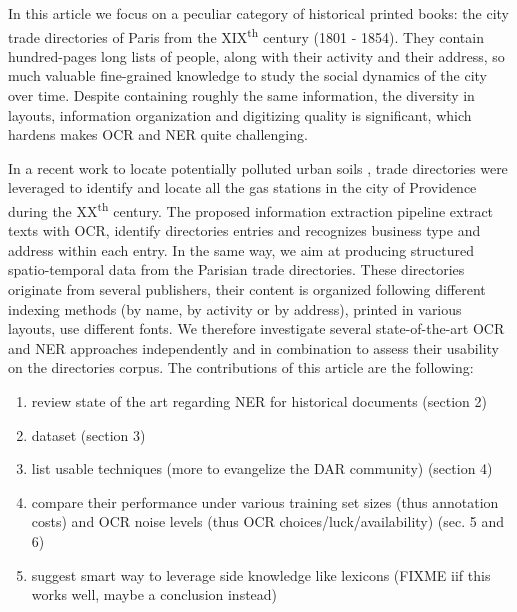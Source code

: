 In this article we focus on a peculiar category of historical printed books: the city trade directories of Paris from the XIX\textsuperscript{th} century (1801 - 1854).
They contain hundred-pages long lists of people, along with their activity and their address, so much valuable fine-grained knowledge to study the social dynamics of the city over time.
Despite containing roughly the same information, the diversity in layouts, information organization and digitizing quality is significant, which hardens makes OCR and NER quite challenging.

In a recent work to locate potentially polluted urban soils \cite{bell2020automated}, trade directories were leveraged to identify and locate all the gas stations in the city of Providence during the XX\textsuperscript{th} century.
The proposed information extraction pipeline extract texts with OCR, identify directories entries and recognizes business type and address within each entry.
In the same way, we aim at producing structured spatio-temporal data from the Parisian trade directories.
These directories originate from several publishers, their content is organized following different indexing methods (by name, by activity or by address), printed in various layouts, use different fonts.
We therefore investigate several state-of-the-art OCR and NER approaches independently and in combination to assess their usability on the directories corpus.
The contributions of this article are the following:
\begin{enumerate}
    \item review state of the art regarding NER for historical documents (section 2)
    \item dataset (section 3)
    \item list usable techniques (more to evangelize the DAR community) (section 4)
    \item compare their performance under various training set sizes (thus annotation costs) and OCR noise levels (thus OCR choices/luck/availability) (sec. 5 and 6)
    \item suggest smart way to leverage side knowledge like lexicons (FIXME iif this works well, maybe a conclusion instead) 
\end{enumerate}


